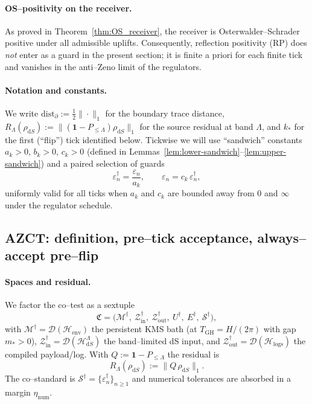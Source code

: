 \documentclass[10pt]{article}
\theoremstyle{definition}
\theoremstyle{plain}
\begin{document}
\paragraph{OS--positivity on the receiver.}\label{par:uom-main-195}
As proved in Theorem~\ref{thm:OS_receiver}, the receiver is Osterwalder--Schrader positive under all admissible uplifts.
Consequently, reflection positivity (RP) does \emph{not} enter as a guard in the present section; it is finite a priori for each finite tick and vanishes in the anti--Zeno limit of the regulators.

\paragraph{Notation and constants.}\label{par:uom-main-196}
We write $\mathrm{dist}_\partial:=\tfrac12\|\cdot\|_1$ for the boundary trace distance,
$R_{\Lambda}(\rho_{\mathrm dS}):=\|(\mathbf 1-P_{\le\Lambda})\rho_{\mathrm dS}\|_1$ for the source residual at band $\Lambda$,
and $k_\ast$ for the first (``flip'') tick identified below.
Tickwise we will use ``sandwich'' constants $a_k>0$, $b_k>0$, $c_k>0$ (defined in Lemmas~\ref{lem:lower-sandwich}--\ref{lem:upper-sandwich})
and a paired selection of guards
\begin{equation}
\label{eq:paired-guards}
\varepsilon_n^\dagger=\frac{\varepsilon_n}{a_k},\qquad
\varepsilon_n=c_k\,\varepsilon_n^\dagger,
\end{equation}
uniformly valid for all ticks when $a_k$ and $c_k$ are bounded away from $0$ and $\infty$ under the regulator schedule.

\subsection{AZCT: definition, pre--tick acceptance, always--accept pre--flip}
\label{subsec:azct-def}

\paragraph{Spaces and residual.}\label{par:uom-main-197}
We factor the co--test as a sextuple
\[
\mathfrak C=\bigl(\mathcal M^\dagger,\ \mathcal Z_{\mathrm{in}}^\dagger,\ \mathcal Z_{\mathrm{out}}^\dagger,\ U^\dagger,\ E^\dagger,\ \mathcal S^\dagger\bigr),
\]
with $\mathcal M^\dagger=\mathcal D(\mathcal H_{\mathrm{env}})$ the persistent KMS bath (at $T_{\mathrm{GH}}=H/(2\pi)$ with gap $m_\ast>0$),
$\mathcal Z_{\mathrm{in}}^\dagger=\mathcal D(\mathcal H_{\mathrm dS}^{\Lambda})$ the band--limited dS input, and
$\mathcal Z_{\mathrm{out}}^\dagger=\mathcal D(\mathcal H_{\mathrm{logs}})$ the compiled payload/log.
With $Q:=\mathbf 1-P_{\le\Lambda}$ the residual is
\begin{equation}
\label{eq:residual-def}
R_\Lambda(\rho_{\mathrm dS}):=\|Q\,\rho_{\mathrm dS}\|_1 .
\end{equation}
The co--standard is $\mathcal S^\dagger=\{\varepsilon_n^\dagger\}_{n\ge 1}$ and numerical tolerances are absorbed in a margin $\eta_{\mathrm{num}}$.
\end{document}
